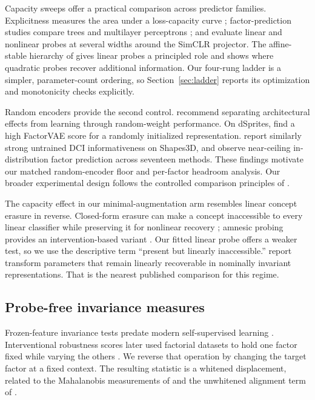 \documentclass[10pt]{article}
\begin{document}
Capacity sweeps offer a practical comparison across predictor families. Explicitness measures the
area under a loss-capacity curve \citep{eastwood2023dcies}; factor-prediction studies compare trees
and multilayer perceptrons \citep{dittadi2021transfer}; and \citet{rashtchian2023substance} evaluate
linear and nonlinear probes at several widths around the SimCLR projector. The affine-stable
hierarchy of \citet{lee2026shallow} gives linear probes a principled role and shows where quadratic
probes recover additional information. Our four-rung ladder is a simpler, parameter-count ordering,
so Section~\ref{sec:ladder} reports its optimization and monotonicity checks explicitly.

Random encoders provide the second control. \citet{saxe2011random} recommend separating
architectural effects from learning through random-weight performance. On dSprites,
\citet{cao2022empirical} find a high FactorVAE score for a randomly initialized representation.
\citet{maziarka2021relationship} report similarly strong untrained DCI informativeness on Shapes3D,
and \citet{schott2022visual} observe near-ceiling in-distribution factor prediction across seventeen
methods. These findings motivate our matched random-encoder floor and per-factor headroom analysis.
Our broader experimental design follows the controlled comparison principles of
\citet{locatello2019challenging}.

The capacity effect in our minimal-augmentation arm resembles linear concept erasure in reverse.
Closed-form erasure can make a concept inaccessible to every linear classifier while preserving it
for nonlinear recovery \citep{belrose2023leace}; amnesic probing provides an intervention-based
variant \citep{elazar2021amnesic}. Our fitted linear probe offers a weaker test, so we use the
descriptive term ``present but linearly inaccessible.'' \citet{foster2021probing} report transform
parameters that remain linearly recoverable in nominally invariant representations. That is the
nearest published comparison for this regime.

\subsection{Probe-free invariance measures}
Frozen-feature invariance tests predate modern self-supervised learning
\citep{goodfellow2009measuring}. Interventional robustness scores later used factorial datasets to
hold one factor fixed while varying the others \citep{suter2019robustly}. We reverse that operation
by changing the target factor at a fixed context. The resulting statistic is a whitened
displacement,
related to the Mahalanobis measurements of \citet{ericsson2022why} and the unwhitened alignment term
of \citet{wang2020understanding}.
\end{document}
